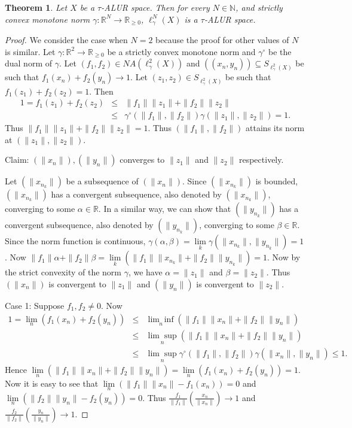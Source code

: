 \documentclass[10pt,a4paper]{amsart}
\newtheorem{thm}{Theorem}
\newcommand{\al}{\alpha}
\newcommand{\be}{\beta}
\newcommand{\beqa}{\begin{eqnarray*}}
\newcommand{\cc}{\circ}
\newcommand{\ci}{\subseteq}
\newcommand{\eeqa}{\end{eqnarray*}}
\newcommand{\ga}{\gamma}
\newcommand{\mb}{\mathbb}
\newcommand{\ra}{\rightarrow}
\begin{document}
\begin{thm}\label{T9}
Let $X$ be a $\tau$-ALUR space. Then for every $N\in\mb{N}$, and strictly convex  monotone norm $\ga:\mb{R}^N\ra\mb{R}_{\geq0}$, $\ell_\ga^N(X)$ is a $\tau$-ALUR space.
\end{thm}

\begin{proof}
We consider the case when $N=2$ because the proof for other values of $N$ is similar. Let $\ga:\mb{R}^2\ra\mb{R}_{\geq0}$ be a strictly convex monotone norm and $\ga^\cc$ be the dual norm of $\ga$. Let $(f_1,f_2)\in NA(\ell_\ga^2(X))$ and $((x_n,y_n))\ci S_{\ell_\ga^2(X)}$ be such that $f_1(x_n)+f_2(y_n)\ra 1$.
Let $(z_1,z_2)\in S_{\ell_\ga^2(X)}$ be such that $f_1(z_1)+f_2(z_2)=1$.
 Then
\beqa
1=f_1(z_1)+f_2(z_2)&\leq&\|f_1\|\|z_1\|+\|f_2\|\|z_2\|\\
&\leq&\ga^\cc(\|f_1\|,\|f_2\|)\ga(\|z_1\|,\|z_2\|)=1.
\eeqa
Thus $\|f_1\|\|z_1\|+\|f_2\|\|z_2\|=1$. Thus $(\|f_1\|,\|f_2\|)$ attains its norm at $(\|z_1\|,\|z_2\|)$. 

{\sc Claim: } $(\|x_n\|), (\|y_n\|)$ converges to $\|z_1\|$ and $\|z_2\|$ respectively.  

Let $(\|x_{n_k}\|)$ be a subsequence of $(\|x_n\|)$. Since $(\|x_{n_k}\|)$ is bounded, $(\|x_{n_k}\|)$ has a convergent subsequence, also denoted by $(\|x_{n_k}\|)$, converging to some $\al\in\mb{R}$. In a similar way, we can show that $(\|y_{n_k}\|)$ has a convergent subsequence, also denoted by $(\|y_{n_k}\|)$, converging to some $\be\in\mb{R}$. Since the norm function is continuous, $\ga(\al,\be)=\underset{k}{\lim}\ga(\|x_{n_k}\|,\|y_{n_k}\|)=1$. Now $\|f_1\|\al+\|f_2\|\be=\underset{k}{\lim}(\|f_1\|\|x_{n_k}\|+\|f_2\|\|y_{n_k}\|)=1$. Now by the strict convexity of the norm $\ga$, we have $\al=\|z_1\|$ and $\be=\|z_2\|$. Thus $(\|x_n\|)$ is convergent to $\|z_1\|$ and $(\|y_n\|)$ is convergent to $\|z_2\|$.

{\sc Case 1: } Suppose $f_1,f_2\neq0$. Now 
\beqa 
1=\underset{n}{\lim}(f_1(x_n)+f_2(y_n))&\leq&\underset{n}{\lim\inf}(\|f_1\|\|x_n\|+\|f_2\|\|y_n\|)\\
&\leq&\underset{n}{\lim\sup}(\|f_1\|\|x_n\|+\|f_2\|\|y_n\|)\\
&\leq&\underset{n}{\lim\sup}\ga^\cc(\|f_1\|,\|f_2\|)\ga(\|x_n\|,\|y_n\|)\leq1.
\eeqa
Hence $\underset{n}{\lim}(\|f_1\|\|x_n\|+\|f_2\|\|y_n\|)=\underset{n}{\lim}(f_1(x_n)+f_2(y_n))=1$. Now it is easy to see that $\underset{n}{\lim}(\|f_1\|\|x_n\|-f_1(x_n))=0$ and $\underset{n}{\lim}(\|f_2\|\|y_n\|-f_2(y_n))=0$. Thus $\frac{f_1}{\|f_1\|}(\frac{x_n}{\|x_n\|})\ra 1$ and $\frac{f_2}{\|f_2\|}(\frac{y_n}{\|y_n\|})\ra1$.


\end{proof}
\end{document}
